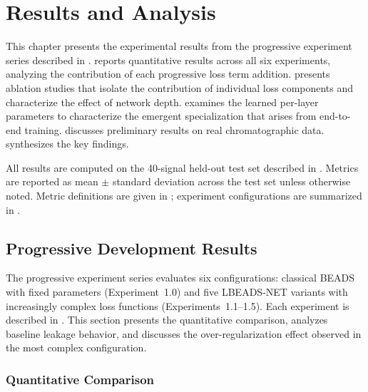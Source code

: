 \chapter{Results and Analysis}
\label{chap:results}

This chapter presents the experimental results from the progressive experiment series described in .  reports quantitative results across all six experiments, analyzing the contribution of each progressive loss term addition.  presents ablation studies that isolate the contribution of individual loss components and characterize the effect of network depth.  examines the learned per-layer parameters to characterize the emergent specialization that arises from end-to-end training.  discusses preliminary results on real chromatographic data.  synthesizes the key findings.

All results are computed on the 40-signal held-out test set described in . Metrics are reported as mean $\pm$ standard deviation across the test set unless otherwise noted. Metric definitions are given in ; experiment configurations are summarized in .


\section{Progressive Development Results}
\label{sec:results_progressive}

The progressive experiment series evaluates six configurations: classical BEADS with fixed parameters (Experiment~1.0) and five LBEADS-NET variants with increasingly complex loss functions (Experiments~1.1--1.5). Each experiment is described in . This section presents the quantitative comparison, analyzes baseline leakage behavior, and discusses the over-regularization effect observed in the most complex configuration.


\subsection{Quantitative Comparison}
\label{sec:results_quantitative}

